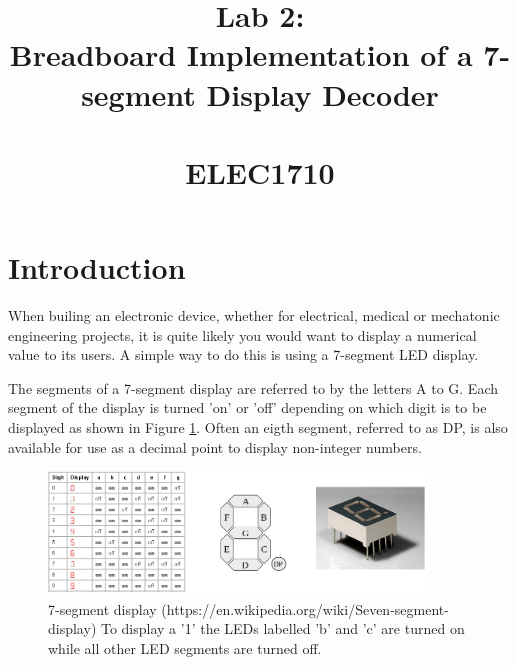 \documentclass{UoNMCHA}
\numberwithin{equation}{section}
\begin{document}
\title{Lab 2:\\Breadboard Implementation of a 7-segment Display Decoder \\ \ \\
{\small ELEC1710  \\ 
}}
\maketitle
\onecolumn

\vspace{-5mm}

\section{Introduction}

When builing an electronic device, whether for electrical, medical or mechatonic engineering projects, it is quite likely you would want to display a numerical value to its users. A simple way to do this is using a 7-segment LED display.

The segments of a 7-segment display are referred to by the letters A to G. Each segment of the display is turned 'on' or 'off' depending on which digit is to be displayed as shown in Figure \ref{fig:7seg}.  Often an eigth segment, referred to as DP, is also available for use as a decimal point to display non-integer numbers.


\begin{figure}[H]
{\includegraphics[width=0.9\textwidth]{Figures/Seven-segment-display-Wikipedia2.png}
\caption{7-segment display ({https://en.wikipedia.org/wiki/Seven-segment-display}) To display a '1' the LEDs labelled 'b' and 'c' are turned on while all other LED segments are turned off.
\label{fig:7seg}}}
\end{figure}
\end{document}
